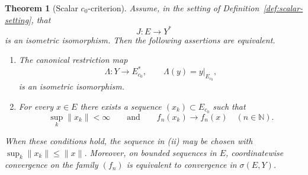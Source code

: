 \documentclass[10pt,a4paper]{amsart}
\newtheorem{theorem}{Theorem}
\newcommand{\N}{\mathbb N}
\begin{document}
\begin{theorem}[Scalar $c_0$-criterion]\label{thm:scalar-c0}
Assume, in the setting of Definition~\ref{def:scalar-setting}, that
\[
        J:E\longrightarrow Y^*
\]
is an isometric isomorphism. Then the following assertions are equivalent.

\begin{enumerate}[label=\textup{(\roman*)}]
\item The canonical restriction map
\[
        \Lambda:Y\longrightarrow E_{c_0}^*,
        \qquad
        \Lambda(y)=y|_{E_{c_0}},
\]
is an isometric isomorphism.

\item For every $x\in E$ there exists a sequence $(x_k)\subset E_{c_0}$
such that
\[
        \sup_k\|x_k\|<\infty
        \qquad\text{and}\qquad
        f_n(x_k)\longrightarrow f_n(x)
        \quad(n\in\N).
\]
\end{enumerate}

When these conditions hold, the sequence in \textup{(ii)} may be chosen
with $\sup_k\|x_k\|\le \|x\|$. Moreover, on bounded sequences in $E$,
coordinatewise convergence on the family $(f_n)$ is equivalent to
convergence in $\sigma(E,Y)$.
\end{theorem}
\end{document}
